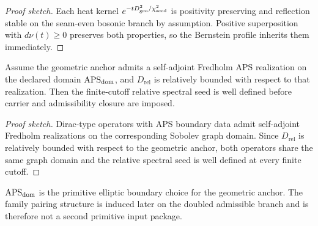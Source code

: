 \begin{proof}[Proof sketch]
Each heat kernel $e^{-tD_{\mathrm{geo}}^2/\chi_{\mathrm{seed}}^2}$ is positivity preserving and reflection
stable on the seam-even bosonic branch by assumption. Positive superposition with
$d\nu(t)\ge 0$ preserves both properties, so the Bernstein profile inherits them immediately.
\end{proof}

\begin{theorem}
Assume the geometric anchor admits a self-adjoint Fredholm APS realization on the declared
domain $\mathrm{APS}_{\mathrm{dom}}$, and $D_{\mathrm{rel}}$ is relatively bounded with respect to that realization.
Then the finite-cutoff relative spectral seed is well defined before carrier and admissibility
closure are imposed.
\end{theorem}

\begin{proof}[Proof sketch]
Dirac-type operators with APS boundary data admit self-adjoint Fredholm realizations on the
corresponding Sobolev graph domain. Since $D_{\mathrm{rel}}$ is relatively bounded with respect
to the geometric anchor, both operators share the same graph domain and the relative spectral
seed is well defined at every finite cutoff.
\end{proof}

\begin{remark}
$\mathrm{APS}_{\mathrm{dom}}$ is the primitive elliptic boundary choice for the geometric anchor. The family
pairing structure is induced later on the doubled admissible branch and is therefore not a
second primitive input package.
\end{remark}

